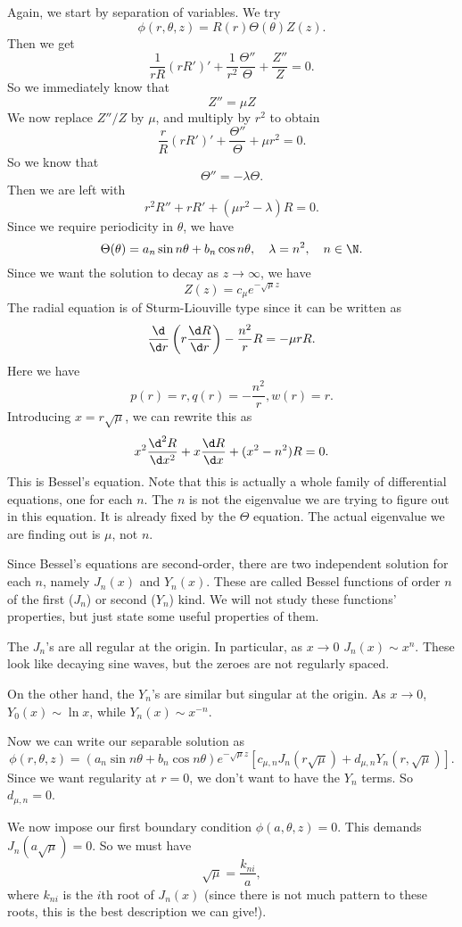\documentclass[a4paper]{article}
\begin{document}
Again, we start by separation of variables. We try
\[
  \phi(r, \theta, z) = R(r) \Theta(\theta)Z(z).
\]
Then we get
\[
  \frac{1}{rR} (rR')' + \frac{1}{r^2}\frac{\Theta''}{\Theta} + \frac{Z''}{Z} = 0.
\]
So we immediately know that
\[
  Z'' = \mu Z
\]
We now replace $Z''/Z$ by $\mu$, and multiply by $r^2$ to obtain
\[
  \frac{r}{R}(rR')' + \frac{\Theta''}{\Theta} + \mu r^2 = 0.
\]
So we know that
\[
  \Theta'' = -\lambda \Theta.
\]
Then we are left with
\[
  r^2 R'' + rR' + (\mu r^2 - \lambda)R = 0.
\]
Since we require periodicity in $\theta$, we have
\[
  \Theta(\theta) = a_n \sin n\theta + b_n \cos n\theta, \quad \lambda = n^2,\quad n \in \N.
\]
Since we want the solution to decay as $z \to \infty$, we have
\[
  Z(z) = c_\mu e^{-\sqrt{\mu}z}
\]
The radial equation is of Sturm-Liouville type since it can be written as
\[
  \frac{\d}{\d r}\left(r \frac{\d R}{\d r}\right) - \frac{n^2}{r}R = -\mu rR.
\]
Here we have
\[
  p(r) = r, q(r) = -\frac{n^2}{r}, w(r) = r.
\]
Introducing $x = r\sqrt{\mu}$, we can rewrite this as
\[
  x^2 \frac{\d^2 R}{\d x^2} + x\frac{\d R}{\d x} + (x^2 - n^2)R = 0.
\]
This is Bessel's equation. Note that this is actually a whole family of differential equations, one for each $n$. The $n$ is not the eigenvalue we are trying to figure out in this equation. It is already fixed by the $\Theta$ equation. The actual eigenvalue we are finding out is $\mu$, not $n$.

Since Bessel's equations are second-order, there are two independent solution for each $n$, namely $J_n(x)$ and $Y_n(x)$. These are called Bessel functions of order $n$ of the first ($J_n$) or second ($Y_n$) kind. We will not study these functions' properties, but just state some useful properties of them.

The $J_n$'s are all regular at the origin. In particular, as $x \to 0$ $J_n (x) \sim x^n$. These look like decaying sine waves, but the zeroes are not regularly spaced.

On the other hand, the $Y_n$'s are similar but singular at the origin. As $x \to 0$, $Y_0(x) \sim \ln x$, while $Y_n(x) \sim x^{-n}$.

Now we can write our separable solution as
\[
  \phi(r, \theta, z) = (a_n \sin n \theta + b_n \cos n\theta) e^{-\sqrt{\mu}z} [c_{\mu, n}J_n (r\sqrt{\mu}) + d_{\mu, n}Y_n (r, \sqrt{\mu})].
\]
Since we want regularity at $r = 0$, we don't want to have the $Y_n$ terms. So $d_{\mu, n} = 0$.

We now impose our first boundary condition $\phi(a, \theta, z) = 0$. This demands $J_n(a \sqrt{\mu}) = 0$. So we must have
\[
  \sqrt{\mu} = \frac{k_{ni}}{a},
\]
where $k_{ni}$ is the $i$th root of $J_n(x)$ (since there is not much pattern to these roots, this is the best description we can give!).
\end{document}
